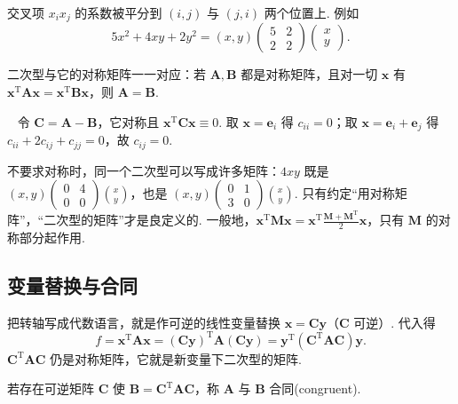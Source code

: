 \documentclass[lang=cn,10.5pt,scheme=chinese,toc=twocol,section,chinesefont=nofont,
twoside,citestyle=gb7714-2015,bibstyle=gb7714-2015]{elegantbook}
\DeclareRobustCommand{\textbf}[1]{{\lnsemiboldlatin\lnsemiboldcjk #1}}
\newcommand{\vv}[1]{\boldsymbol{#1}}
\newcommand{\trans}{\mathrm{T}}             %
\numberwithin{equation}{section}   %
\newcommand*{\lnlabel}[1]{{\sffamily\bfseries\color{black}#1}}
\renewenvironment{proof}{%
	\par\noindent\lnlabel{\proofname}\;\ \color{black!90}\cfs}{\par}
\begin{document}
交叉项 $x_ix_j$ 的系数被\textbf{平分}到 $(i,j)$ 与 $(j,i)$ 两个位置上. 例如
\[
  5x^2+4xy+2y^2=(x,y)
  \begin{pmatrix}
    5 & 2 \\2&2
  \end{pmatrix}
  \begin{pmatrix}
    x \\y
  \end{pmatrix}
  .
\]

\begin{proposition}
  二次型与它的对称矩阵一一对应：若 $\vv A,\vv B$ 都是对称矩阵，且对一切 $\vv x$ 有 $\vv x^\trans\vv A\vv x=\vv x^\trans\vv B\vv x$，则 $\vv A=\vv B$.
\end{proposition}
\begin{proof}
  令 $\vv C=\vv A-\vv B$，它对称且 $\vv x^\trans\vv C\vv x\equiv0$. 取 $\vv x=\vv e_i$ 得 $c_{ii}=0$；取 $\vv x=\vv e_i+\vv e_j$ 得 $c_{ii}+2c_{ij}+c_{jj}=0$，故 $c_{ij}=0$.
\end{proof}

\begin{pitfallbox}
  不要求对称时，同一个二次型可以写成许多矩阵：$4xy$ 既是 $(x,y)
    \begin{pmatrix}
      0 & 4 \\0&0
    \end{pmatrix}
    \binom xy$，也是 $(x,y)
    \begin{pmatrix}
      0 & 1 \\3&0
    \end{pmatrix}
    \binom xy$. 只有约定“用对称矩阵”，“二次型的矩阵”才是良定义的. 一般地，$\vv x^\trans\vv M\vv x=\vv x^\trans\frac{\vv M+\vv M^\trans}2\vv x$，只有 $\vv M$ 的对称部分起作用.
\end{pitfallbox}

\subsection{变量替换与合同}

把转轴写成代数语言，就是作可逆的线性变量替换 $\vv x=\vv C\vv y$（$\vv C$ 可逆）. 代入得
\[
  f=\vv x^\trans\vv A\vv x=(\vv C\vv y)^\trans\vv A(\vv C\vv y)=\vv y^\trans(\vv C^\trans\vv A\vv C)\vv y.
\]
$\vv C^\trans\vv A\vv C$ 仍是对称矩阵，它就是新变量下二次型的矩阵.

\begin{definition}
  若存在可逆矩阵 $\vv C$ 使 $\vv B=\vv C^\trans\vv A\vv C$，称 $\vv A$ 与 $\vv B$ \textbf{合同}(congruent).
\end{definition}
\end{document}
